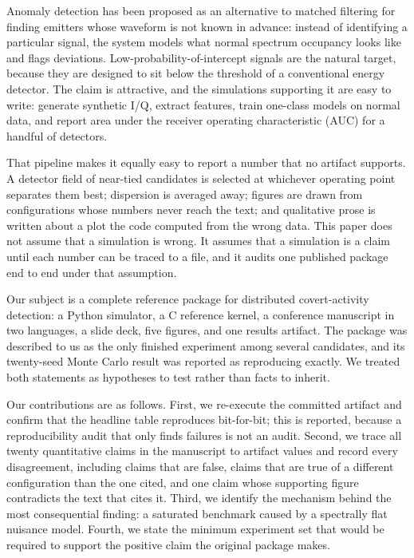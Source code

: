 \documentclass[conference]{IEEEtran}
\begin{document}
Anomaly detection has been proposed as an alternative to matched filtering for finding emitters whose waveform is not known in advance: instead of identifying a particular signal, the system models what normal spectrum occupancy looks like and flags deviations. Low-probability-of-intercept signals are the natural target, because they are designed to sit below the threshold of a conventional energy detector. The claim is attractive, and the simulations supporting it are easy to write: generate synthetic I/Q, extract features, train one-class models on normal data, and report area under the receiver operating characteristic (AUC) for a handful of detectors.

That pipeline makes it equally easy to report a number that no artifact supports. A detector field of near-tied candidates is selected at whichever operating point separates them best; dispersion is averaged away; figures are drawn from configurations whose numbers never reach the text; and qualitative prose is written about a plot the code computed from the wrong data. This paper does not assume that a simulation is wrong. It assumes that a simulation is a claim until each number can be traced to a file, and it audits one published package end to end under that assumption.

Our subject is a complete reference package for distributed covert-activity detection: a Python simulator, a C reference kernel, a conference manuscript in two languages, a slide deck, five figures, and one results artifact. The package was described to us as the only finished experiment among several candidates, and its twenty-seed Monte Carlo result was reported as reproducing exactly. We treated both statements as hypotheses to test rather than facts to inherit.

Our contributions are as follows. First, we re-execute the committed artifact and confirm that the headline table reproduces bit-for-bit; this is reported, because a reproducibility audit that only finds failures is not an audit. Second, we trace all twenty quantitative claims in the manuscript to artifact values and record every disagreement, including claims that are false, claims that are true of a different configuration than the one cited, and one claim whose supporting figure contradicts the text that cites it. Third, we identify the mechanism behind the most consequential finding: a saturated benchmark caused by a spectrally flat nuisance model. Fourth, we state the minimum experiment set that would be required to support the positive claim the original package makes.
\end{document}
